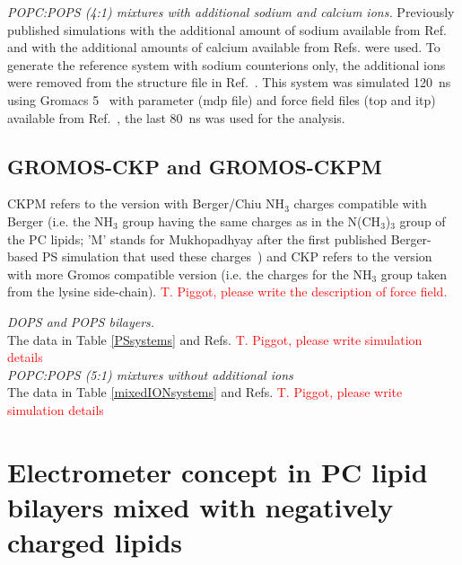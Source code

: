 \documentclass[journal=jpcbfk]{achemso}
\newcommand{\todo}[1]{\textcolor{red}{#1}}
\begin{document}
\noindent
{\it POPC:POPS (4:1) mixtures with additional sodium and calcium ions.} 
Previously published simulations with the additional amount of sodium \cite{jurkiewicz12}
available from Ref.  and with the additional amounts
of calcium \cite{melcrova16} available from Refs. 
were used. To generate the reference system with sodium counterions only,
the additional ions were removed from the structure file in Ref.~.
This system was simulated 120~ns using Gromacs 5~\cite{abraham2015gromacs} with parameter (mdp file)
and force field files (top and itp) available from Ref.~,
the last 80~ns was used for the analysis.


\subsection{GROMOS-CKP and GROMOS-CKPM}
  CKPM refers to the version with Berger/Chiu NH$_3$ charges compatible with Berger
   (i.e. the NH$_3$ group having the same charges as in the N(CH$_3$)$_3$ group of the PC lipids;
   'M' stands for Mukhopadhyay after the first published Berger-based PS simulation that used these charges~\cite{mukhopadhyay04})
   and CKP refers to the version with more Gromos compatible version
   (i.e. the charges for the NH$_3$ group taken from the lysine side-chain).
\todo{T. Piggot, please write the description of force field.}

\noindent
{\it DOPS and POPS bilayers.} \\
The data in Table \ref{PSsystems} and Refs. 
\todo{T. Piggot, please write simulation details} \\

\noindent
    {\it POPC:POPS (5:1) mixtures without additional ions}\\
    The data in Table \ref{mixedIONsystems} and Refs. 
\todo{T. Piggot, please write simulation details} \\



\section{Electrometer concept in PC lipid bilayers mixed with negatively charged lipids}\label{electrometerFORmixtures}
\end{document}
